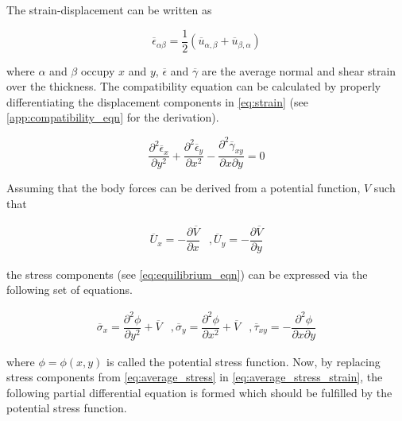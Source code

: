 \documentclass{article}
\begin{document}
The strain-displacement can be written as

\begin{equation}
    \overline{\epsilon}_{\alpha\beta} = \frac{1}{2}(\overline{u}_{\alpha, \beta} + \overline{u}_{\beta, \alpha})
    \label{eq:strain}
\end{equation}

where $\alpha$ and $\beta$ occupy $x$ and $y$, $\overline{\epsilon}$ and $\overline{\gamma}$ are the average normal and shear strain over the thickness. The compatibility equation can be calculated by properly differentiating the displacement components in \cref{eq:strain} (see \cref{app:compatibility_eqn} for the derivation).

\begin{equation}
    \dfrac{\partial^2 \overline{\epsilon}_x}{\partial y^2} + \dfrac{\partial^2 \overline{\epsilon}_y}{\partial x^2} - \dfrac{\partial^2 \overline{\gamma}_{xy}}{\partial x \partial y} = 0
    \label{eq:compatibility}
\end{equation}

Assuming that the body forces can be derived from a potential function, $V$ such that

\begin{equation*}
    \begin{matrix}
    \overline{U}_x = -\dfrac{\partial \overline{V}}{\partial x} & , 
    \overline{U}_y = -\dfrac{\partial \overline{V}}{\partial y}
    \end{matrix}
\end{equation*}

the stress components (see \cref{eq:equilibrium_eqn}) can be expressed via the following set of equations.

\begin{equation}
    \begin{matrix}
    \overline{\sigma}_x = \dfrac{\partial^2 \phi}{\partial y^2} + \overline{V} & , 
    \overline{\sigma}_y = \dfrac{\partial^2 \phi}{\partial x^2} + \overline{V} & , 
    \overline{\tau}_{xy} = -\dfrac{\partial^2 \phi}{\partial x \partial y}
    \end{matrix}
    \label{eq:average_stress}
\end{equation}

where $\phi = \phi(x, y)$ is called the potential stress function. Now, by replacing stress components from \cref{eq:average_stress} in \cref{eq:average_stress_strain}, the following partial differential equation is formed which should be fulfilled by the potential stress function.
\end{document}
